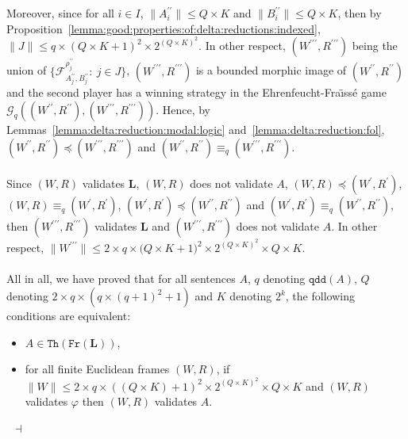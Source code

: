 \documentclass[draft]{article}
\newenvironment{proof}{{\bf Proof:}}{~$\dashv$\\}
\def\qdd{\mathtt{qdd}}
\def\Th{\mathtt{Th}}
\def\Fr{\mathtt{Fr}}
\def\L{\mathbf{L}}
\begin{document}
\begin{proof}
Moreover, since for all $i{\in}I$, ${\parallel}A_{i}^{\prime\prime}{\parallel}{\leq}Q{\times}K$ and ${\parallel}B_{i}^{\prime\prime}{\parallel}{\leq}Q{\times}K$, then by Proposition~\ref{lemma:good:properties:of:delta:reductions:indexed}, ${\parallel}J{\parallel}{\leq}q{\times}(Q{\times}K{+}1)^{2}{\times}2^{(Q{\times}K)^{2}}$.
In other respect, $(W^{\prime\prime\prime},R^{\prime\prime\prime})$ being the union of $\{{\mathcal F}_{A_{j}^{\prime\prime},B_{j}^{\prime\prime}}^{\rho_{j}^{\prime\prime}}:\ j{\in}J\}$, $(W^{\prime\prime\prime},R^{\prime\prime\prime})$ is a bounded morphic image of $(W^{\prime\prime},R^{\prime\prime})$ and the second player has a winning strategy in the Ehrenfeucht-Fra\"\i ss\'e game ${\mathcal G}_{q}((W^{\prime\prime},R^{\prime\prime}),(W^{\prime\prime\prime},R^{\prime\prime\prime}))$.
Hence, by Lemmas~\ref{lemma:delta:reduction:modal:logic} and~\ref{lemma:delta:reduction:fol}, $(W^{\prime\prime},R^{\prime\prime}){\preceq}(W^{\prime\prime\prime},R^{\prime\prime\prime})$ and $(W^{\prime\prime},R^{\prime\prime}){\equiv_{q}}(W^{\prime\prime\prime},R^{\prime\prime\prime})$.
%
%
\\
\\
%
%
Since $(W,R)$ validates $\L$, $(W,R)$ does not validate $A$, $(W,R){\preceq}(W^{\prime},R^{\prime})$, $(W,R)
%
%
%
%
%
%
%
%
%
%
%
%
$\linebreak$
%
%
%
%
%
%
%
%
%
%
%
%
{\equiv_{q}}(W^{\prime},R^{\prime})$, $(W^{\prime},R^{\prime}){\preceq}(W^{\prime\prime},R^{\prime\prime})$ and $(W^{\prime},R^{\prime}){\equiv_{q}}(W^{\prime\prime},R^{\prime\prime})$, then $(W^{\prime\prime\prime},R^{\prime\prime\prime})$ validates $\L$ and $(W^{\prime\prime\prime},R^{\prime\prime\prime})$ does not validate $A$.
In other respect, ${\parallel}W^{\prime\prime\prime}{\parallel}{\leq}2{\times}q{\times}(Q{\times}
%
%
%
%
%
%
%
%
%
%
%
%
$\linebreak$
%
%
%
%
%
%
%
%
%
%
%
%
K{+}1)^{2}{\times}2^{(Q{\times}K)^{2}}{\times}Q{\times}K$.
%
%
\\
\\
%
%
All in all, we have proved that for all sentences $A$, $q$ denoting $\qdd(A)$, $Q$ denoting $2{\times}q{\times}(q{\times}(q{+}1)^{2}+1)$ and $K$ denoting $2^{k}$, the following conditions are equivalent:
%
%
\begin{itemize}
%
%
\item $A{\in}\Th(\Fr(\L))$,
%
%
\item for all finite Euclidean frames $(W,R)$, if ${\parallel}W{\parallel}{\leq}2{\times}q{\times}((Q{\times}K){+}1)^{2}{\times}
%
%
%
%
%
%
%
%
%
%
%
%
$\linebreak$
%
%
%
%
%
%
%
%
%
%
%
%
2^{(Q{\times}K)^{2}}{\times}Q{\times}K$ and $(W,R)$ validates $\varphi$ then $(W,R)$ validates $A$.
%
%
\end{itemize}
%
%
\medskip
%
%
\end{proof}
\end{document}
